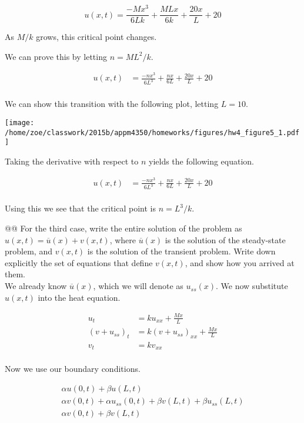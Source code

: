 \documentclass[10pt]{article}
\begin{document}
\begin{easylist}[enumerate]
    \[
        u(x, t) = \frac{-Mx^3}{6Lk} + \frac{MLx}{6k} + \frac{20x}{L} + 20
    \]

    As $M / k$ grows, this critical point changes.

    We can prove this by letting $n = ML^2 / k$.

    \begin{align*}
        u(x, t) &= \frac{-nx^3}{6L^3} + \frac{nx}{6L} + \frac{20x}{L} + 20\\
    \end{align*}

    We can show this transition with the following plot, letting $L = 10$.

\simpleweave

\texttt{[image: /home/zoe/classwork/2015b/appm4350/homeworks/figures/hw4\_figure5\_1.pdf]}

\nosimpleweave

    Taking the derivative with respect to $n$ yields the following equation.

    \begin{align*}
        u(x, t) &= \frac{-nx^3}{6L^3} + \frac{nx}{6L} + \frac{20x}{L} + 20\\
    \end{align*}

    Using this we see that the critical point is $n = L^3/k$.

    @@ For the third case, write the entire solution of the problem as $u(x, t) = \overline{u}(x) + v(x, t)$, where
    $\overline{u}(x)$ is the solution of the steady-state problem, and $v(x, t)$ is the solution of the transient
    problem. Write down explicitly the set of equations that define $v(x, t)$, and show how you arrived at them.\\

    We already know $\overline{u}(x)$, which we will denote as $u_{ss}(x)$. We now substitute $u(x, t)$ into the heat
    equation.

    \begin{align*}
        u_t &= ku_{xx} + \frac{Mx}{L}\\
        {(v + u_{ss})}_t &= k{(v + u_{ss})}_{xx} + \frac{Mx}{L}\\
        v_t &= kv_{xx}\\
    \end{align*}

    Now we use our boundary conditions.

    \begin{align*}
        \alpha u(0, t) + \beta u(L, t)\\
        \alpha v(0, t) + \alpha u_{ss}(0, t) + \beta v(L, t) + \beta u_{ss}(L, t)\\
        \alpha v(0, t) + \beta v(L, t)\\
    \end{align*}


\end{easylist}
\end{document}
